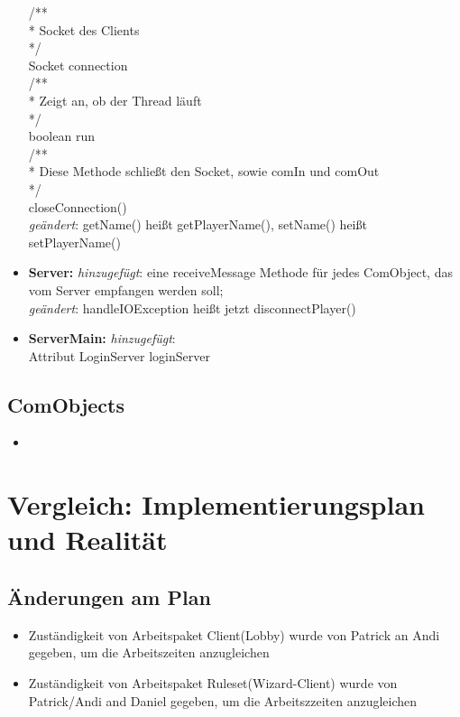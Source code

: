 \documentclass{article}
\begin{document}
\begin{itemize}
/**\\
 * Socket des Clients\\
 */\\
Socket connection\\
/**\\
 * Zeigt an, ob der Thread läuft\\
 */\\
boolean run\\
/**\\
 * Diese Methode schließt den Socket, sowie comIn und comOut\\
 */\\
closeConnection()\\

\textit{geändert}: getName() heißt getPlayerName(), setName() heißt setPlayerName()
\\
\item  \textbf{Server:} \textit{hinzugefügt}: eine receiveMessage Methode für jedes ComObject, das vom Server empfangen werden soll; \\
\textit{geändert}: handleIOException heißt jetzt disconnectPlayer()
\\
\item  \textbf{ServerMain:} \textit{hinzugefügt}:\\
 Attribut LoginServer loginServer\\
\end{itemize}

\subsection{ComObjects}

\begin{itemize}
\item 
\end{itemize}

\newpage

\section{Vergleich: Implementierungsplan und Realität}

\subsection{Änderungen am Plan}
\begin{itemize}
\item Zuständigkeit von Arbeitspaket Client(Lobby) wurde von Patrick an Andi gegeben, um die Arbeitszeiten anzugleichen
\item Zuständigkeit von Arbeitspaket Ruleset(Wizard-Client) wurde von Patrick/Andi and Daniel gegeben, um die Arbeitszzeiten anzugleichen
\end{itemize}
\end{document}
